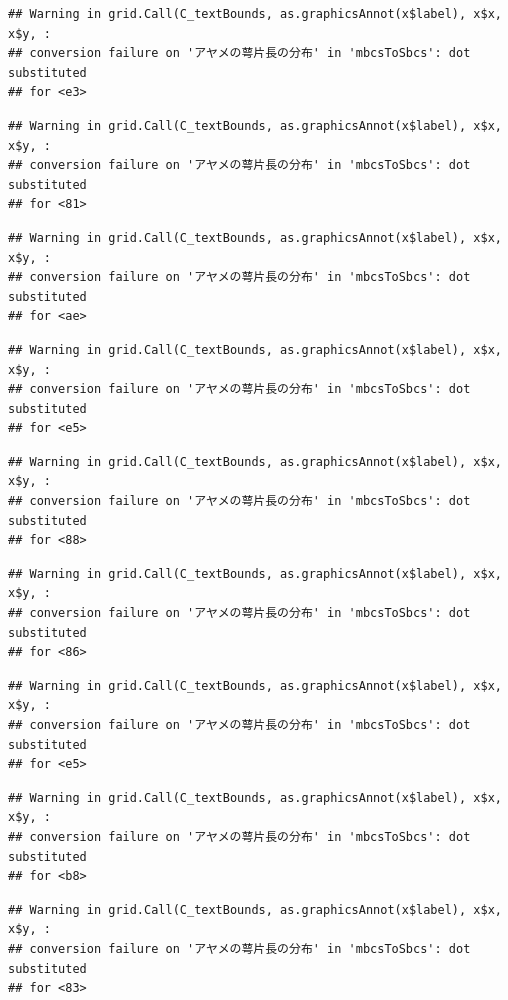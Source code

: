 \documentclass[
]{book}
\begin{document}
\begin{verbatim}
## Warning in grid.Call(C_textBounds, as.graphicsAnnot(x$label), x$x, x$y, :
## conversion failure on 'アヤメの萼片長の分布' in 'mbcsToSbcs': dot substituted
## for <e3>
\end{verbatim}

\begin{verbatim}
## Warning in grid.Call(C_textBounds, as.graphicsAnnot(x$label), x$x, x$y, :
## conversion failure on 'アヤメの萼片長の分布' in 'mbcsToSbcs': dot substituted
## for <81>
\end{verbatim}

\begin{verbatim}
## Warning in grid.Call(C_textBounds, as.graphicsAnnot(x$label), x$x, x$y, :
## conversion failure on 'アヤメの萼片長の分布' in 'mbcsToSbcs': dot substituted
## for <ae>
\end{verbatim}

\begin{verbatim}
## Warning in grid.Call(C_textBounds, as.graphicsAnnot(x$label), x$x, x$y, :
## conversion failure on 'アヤメの萼片長の分布' in 'mbcsToSbcs': dot substituted
## for <e5>
\end{verbatim}

\begin{verbatim}
## Warning in grid.Call(C_textBounds, as.graphicsAnnot(x$label), x$x, x$y, :
## conversion failure on 'アヤメの萼片長の分布' in 'mbcsToSbcs': dot substituted
## for <88>
\end{verbatim}

\begin{verbatim}
## Warning in grid.Call(C_textBounds, as.graphicsAnnot(x$label), x$x, x$y, :
## conversion failure on 'アヤメの萼片長の分布' in 'mbcsToSbcs': dot substituted
## for <86>
\end{verbatim}

\begin{verbatim}
## Warning in grid.Call(C_textBounds, as.graphicsAnnot(x$label), x$x, x$y, :
## conversion failure on 'アヤメの萼片長の分布' in 'mbcsToSbcs': dot substituted
## for <e5>
\end{verbatim}

\begin{verbatim}
## Warning in grid.Call(C_textBounds, as.graphicsAnnot(x$label), x$x, x$y, :
## conversion failure on 'アヤメの萼片長の分布' in 'mbcsToSbcs': dot substituted
## for <b8>
\end{verbatim}

\begin{verbatim}
## Warning in grid.Call(C_textBounds, as.graphicsAnnot(x$label), x$x, x$y, :
## conversion failure on 'アヤメの萼片長の分布' in 'mbcsToSbcs': dot substituted
## for <83>
\end{verbatim}
\end{document}

